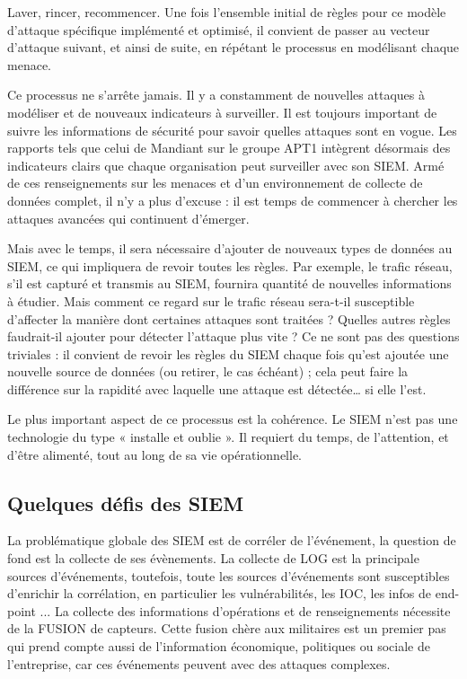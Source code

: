 Laver, rincer, recommencer. Une fois l’ensemble initial de règles pour ce modèle d’attaque spécifique implémenté et optimisé, il convient de passer au vecteur d’attaque suivant, et ainsi de suite, en répétant le processus en modélisant chaque menace.

Ce processus ne s’arrête jamais. Il y a constamment de nouvelles attaques à modéliser et de nouveaux indicateurs à surveiller. Il est toujours important de suivre les informations de sécurité pour savoir quelles attaques sont en vogue. Les rapports tels que celui de Mandiant sur le groupe APT1 intègrent désormais des indicateurs clairs que chaque organisation peut surveiller avec son SIEM. Armé de ces renseignements sur les menaces et d’un environnement de collecte de données complet, il n’y a plus d’excuse : il est temps de commencer à chercher les attaques avancées qui continuent d’émerger.

Mais avec le temps, il sera nécessaire d’ajouter de nouveaux types de données au SIEM, ce qui impliquera de revoir toutes les règles. Par exemple, le trafic réseau, s’il est capturé et transmis au SIEM, fournira quantité de nouvelles informations à étudier. Mais comment ce regard sur le trafic réseau sera-t-il susceptible d’affecter la manière dont certaines attaques sont traitées ? Quelles autres règles faudrait-il ajouter pour détecter l’attaque plus vite ? Ce ne sont pas des questions triviales : il convient de revoir les règles du SIEM chaque fois qu’est ajoutée une nouvelle source de données (ou retirer, le cas échéant) ; cela peut faire la différence sur la rapidité avec laquelle une attaque est détectée… si elle l’est.

Le plus important aspect de ce processus est la cohérence. Le SIEM n’est pas une technologie du type « installe et oublie ». Il requiert du temps, de l’attention, et d’être alimenté, tout au long de sa vie opérationnelle.



\subsection{Quelques défis des SIEM	}

La problématique globale des SIEM est de corréler de l'événement, la question de fond est la collecte de ses évènements. La collecte de LOG est la principale sources d'événements, toutefois, toute les sources d'événements sont susceptibles d'enrichir la corrélation, en particulier les vulnérabilités, les IOC, les infos de end-point ...
La collecte des informations d'opérations et de renseignements nécessite de la FUSION de capteurs.  Cette fusion chère aux militaires est un premier pas qui prend compte aussi de l'information économique, politiques ou sociale de l'entreprise, car ces événements peuvent  avec des attaques complexes.
  

